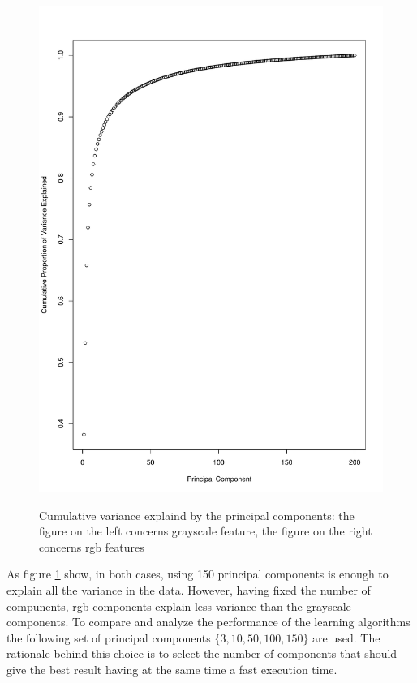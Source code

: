 \documentclass{article}
\begin{document}
\begin{figure}[H]
\begin{adjustwidth}{-4cm}{-4cm}
{    \includegraphics[scale=0.3]{../cumulative_variance_grb.pdf} 
     }
     \centering
     \caption{Cumulative variance explaind by the principal components: the figure on the left concerns grayscale feature, the figure on the right concerns rgb features}  \label{variance}
      \end{adjustwidth} 
   \end{figure}

\noindent As figure \ref{variance} show, in both cases, using 150 principal components is enough to explain all the variance in the data. However, having fixed the number of compunents, rgb components explain less variance than the grayscale components. To compare and analyze the performance of the learning algorithms the following set of principal components $\{3,10,50,100,150\}$ are used. The rationale behind this choice is to select the number of components that should give the best result having at the same time a fast execution time. \\
 
\end{document}
